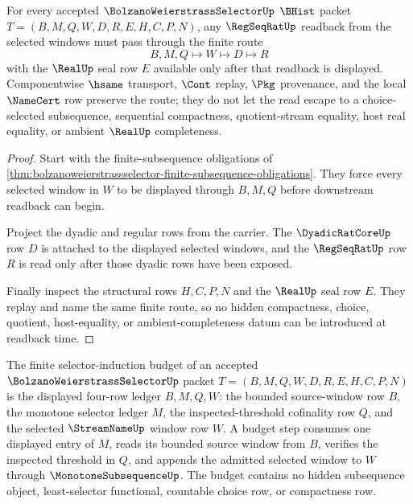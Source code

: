 \begin{theorem}
\label{thm:bolzanoweierstrassselector-regseqrat-readback-nonescape}
For every accepted $\BolzanoWeierstrassSelectorUp$ $\BHist$ packet $T=(B,M,Q,W,D,R,E,H,C,P,N)$, any $\RegSeqRatUp$ readback from the selected windows must pass through the finite route
$$
B,M,Q\longmapsto W\longmapsto D\longmapsto R
$$
with the $\RealUp$ seal row $E$ available only after that readback is displayed. Componentwise $\hsame$ transport, $\Cont$ replay, $\Pkg$ provenance, and the local $\NameCert$ row preserve the route; they do not let the read escape to a choice-selected subsequence, sequential compactness, quotient-stream equality, host real equality, or ambient $\RealUp$ completeness.
\end{theorem}
\begin{proof}
Start with the finite-subsequence obligations of \autoref{thm:bolzanoweierstrassselector-finite-subsequence-obligations}. They force every selected window in $W$ to be displayed through $B,M,Q$ before downstream readback can begin.

Project the dyadic and regular rows from the carrier. The $\DyadicRatCoreUp$ row $D$ is attached to the displayed selected windows, and the $\RegSeqRatUp$ row $R$ is read only after those dyadic rows have been exposed.

Finally inspect the structural rows $H,C,P,N$ and the $\RealUp$ seal row $E$. They replay and name the same finite route, so no hidden compactness, choice, quotient, host-equality, or ambient-completeness datum can be introduced at readback time.
\end{proof}

\begin{definition}
\label{def:bolzano-weierstrass-selector-induction-budget}
The finite selector-induction budget of an accepted
$\BolzanoWeierstrassSelectorUp$ packet $T=(B,M,Q,W,D,R,E,H,C,P,N)$ is the
displayed four-row ledger $B,M,Q,W$: the bounded source-window row $B$, the
monotone selector ledger $M$, the inspected-threshold cofinality row $Q$, and
the selected $\StreamNameUp$ window row $W$. A budget step consumes one displayed
entry of $M$, reads its bounded source window from $B$, verifies the inspected
threshold in $Q$, and appends the admitted selected window to $W$ through
$\MonotoneSubsequenceUp$. The budget contains no hidden subsequence object,
least-selector functional, countable choice row, or compactness row.
\end{definition}

